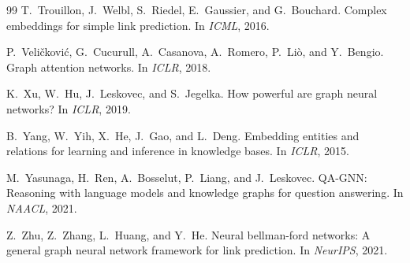 \documentclass[11pt,a4paper,oneside,openany]{book}
\theoremstyle{definition}
\theoremstyle{plain}
\theoremstyle{remark}
\begin{document}
\begin{thebibliography}{99}
	T.~Trouillon, J.~Welbl, S.~Riedel, E.~Gaussier, and G.~Bouchard.
	\newblock Complex embeddings for simple link prediction.
	\newblock In \emph{ICML}, 2016.

	P.~Veli\v{c}kovi\'{c}, G.~Cucurull, A.~Casanova, A.~Romero, P.~Li\`{o},
	and Y.~Bengio.
	\newblock Graph attention networks.
	\newblock In \emph{ICLR}, 2018.

	K.~Xu, W.~Hu, J.~Leskovec, and S.~Jegelka.
	\newblock How powerful are graph neural networks?
	\newblock In \emph{ICLR}, 2019.

	B.~Yang, W.~Yih, X.~He, J.~Gao, and L.~Deng.
	\newblock Embedding entities and relations for learning and inference in
	knowledge bases.
	\newblock In \emph{ICLR}, 2015.

	M.~Yasunaga, H.~Ren, A.~Bosselut, P.~Liang, and J.~Leskovec.
	\newblock QA-GNN: Reasoning with language models and knowledge graphs for
	question answering.
	\newblock In \emph{NAACL}, 2021.

	Z.~Zhu, Z.~Zhang, L.~Huang, and Y.~He.
	\newblock Neural bellman-ford networks: A general graph neural network framework
	for link prediction.
	\newblock In \emph{NeurIPS}, 2021.

\end{thebibliography}

\end{document}
